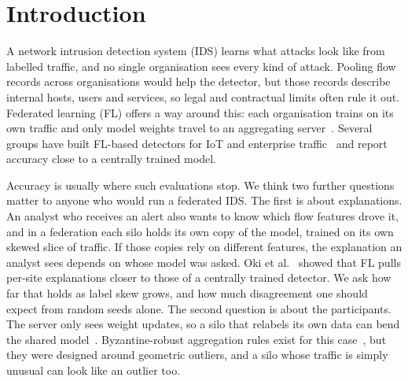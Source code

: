 \documentclass[conference]{IEEEtran}
\begin{document}
\section{Introduction}

A network intrusion detection system (IDS) learns what attacks look like from labelled
traffic, and no single organisation sees every kind of attack. Pooling flow records
across organisations would help the detector, but those records describe internal
hosts, users and services, so legal and contractual limits often rule it out.
Federated learning (FL) offers a way around this: each organisation trains on its own
traffic and only model weights travel to an aggregating server~\cite{mcmahan2017}.
Several groups have built FL-based detectors for IoT and enterprise
traffic~\cite{nguyen2019diot,rahman2020,mothukuri2022,campos2022,agrawal2022} and report
accuracy close to a centrally trained model.

Accuracy is usually where such evaluations stop. We think two further questions matter
to anyone who would run a federated IDS. The first is about explanations. An analyst who
receives an alert also wants to know which flow features drove it, and in a federation
each silo holds its own copy of the model, trained on its own skewed slice of traffic.
If those copies rely on different features, the explanation an analyst sees depends on
whose model was asked. Oki et al.~\cite{oki2024} showed that FL pulls per-site
explanations closer to those of a centrally trained detector. We ask how far that holds
as label skew grows, and how much disagreement one should expect from random seeds
alone. The second question is about the participants. The server only sees weight
updates, so a silo that relabels its own data can bend the shared
model~\cite{tolpegin2020,nguyen2020poison}. Byzantine-robust aggregation rules exist for
this case~\cite{blanchard2017,yin2018}, but they were designed around geometric
outliers, and a silo whose traffic is simply unusual can look like an outlier too.
\end{document}
